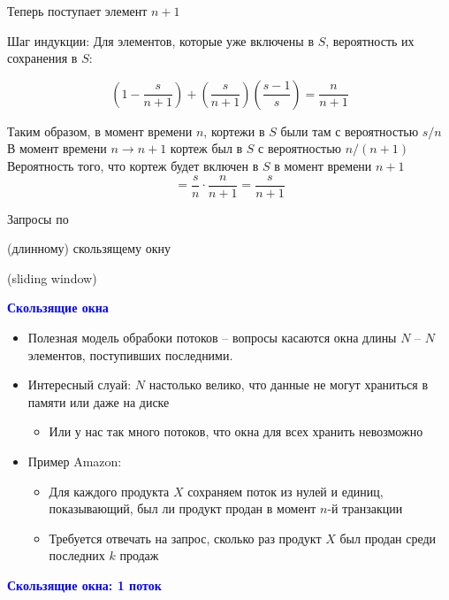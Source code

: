 \documentclass[landscape]{slides}
\begin{document}
\begin{normalsize}
\begin{slide}
Теперь поступает элемент $n+1$

Шаг индукции: Для элементов, которые уже включены в $S$, вероятность их сохранения в $S$:

$$
\left(1 - \frac{s}{n+1}\right) +
\left(\frac{s}{n+1}\right)
\left(\frac{s-1}{s}\right) =
\frac{n}{n+1}
$$


Таким образом, в момент времени $n$, кортежи в $S$ были там с вероятностью $s/n$
В момент времени $n \to n+1$ кортеж был в $S$ с вероятностью $n/(n+1)$
Вероятность того, что кортеж будет включен в $S$ в момент времени $n+1$
$$ = \frac sn \cdot \frac n{n+1} = \frac s{n+1} $$
\end{slide}


\begin{slide}
Запросы по

(длинному) скользящему окну

(sliding window)
\end{slide}


\begin{slide}
\textbf{\textcolor{blue}{Скользящие окна}}


\begin{itemize}
\item Полезная модель обрабоки потоков -- вопросы касаются окна длины $N$ -- $N$ элементов, поступивших последними.

\item Интересный слуай: $N$ настолько велико, что данные не могут храниться в памяти или даже на диске

  \begin{itemize}
  \item Или у нас так много потоков, что окна для всех хранить невозможно
  \end{itemize}

\item Пример Amazon: 

  \begin{itemize}
  \item Для каждого продукта $X$ сохраняем поток из нулей и единиц, показывающий, был ли продукт продан в момент $n$-й транзакции

  \item Требуется отвечать на запрос, сколько раз продукт $X$ был продан среди последних $k$ продаж
  \end{itemize}
\end{itemize}
\end{slide}


\begin{slide}
\textbf{\textcolor{blue}{Скользящие окна: 1 поток}}


\end{slide}
\end{normalsize}
\end{document}

